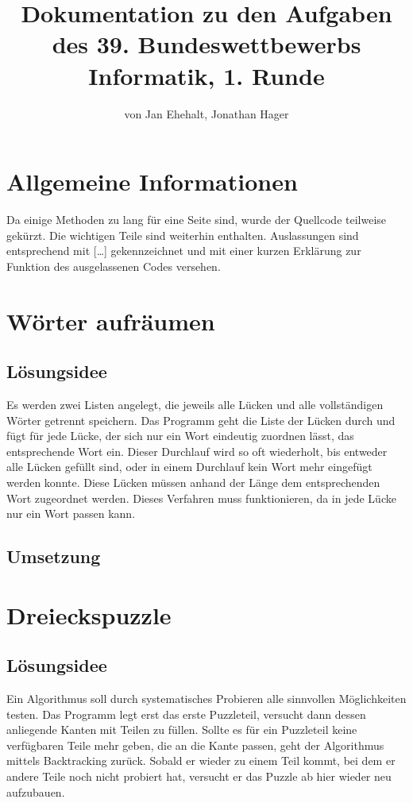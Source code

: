 \documentclass[a4paper, 12pt]{scrartcl}
\title{Dokumentation zu den Aufgaben des 39. Bundeswettbewerbs Informatik, 1. Runde}
\author{von Jan Ehehalt, Jonathan Hager}
\date{}
\begin{document}
\maketitle
\thispagestyle{empty}
\newpage
\tableofcontents
\thispagestyle{empty}
\newpage

\section{Allgemeine Informationen}

Da einige Methoden zu lang für eine Seite sind, wurde der Quellcode teilweise gekürzt. Die wichtigen Teile sind weiterhin enthalten. Auslassungen sind entsprechend mit {\glqq}[\dots]{\grqq} gekennzeichnet und mit einer kurzen Erklärung zur Funktion des ausgelassenen Codes versehen.

\section{Wörter aufräumen}
\subsection{Lösungsidee}

Es werden zwei Listen angelegt, die jeweils alle Lücken und alle vollständigen Wörter getrennt speichern. Das Programm geht die Liste der Lücken durch und fügt für jede Lücke, der sich nur ein Wort eindeutig zuordnen lässt, das entsprechende Wort ein. Dieser Durchlauf wird so oft wiederholt, bis entweder alle Lücken gefüllt sind, oder in einem Durchlauf kein Wort mehr eingefügt werden konnte. Diese Lücken müssen anhand der Länge dem entsprechenden Wort zugeordnet werden. Dieses Verfahren muss funktionieren, da in jede Lücke nur ein Wort passen kann.  

\subsection{Umsetzung}

\section{Dreieckspuzzle}
\subsection{Lösungsidee}

Ein Algorithmus soll durch systematisches Probieren alle sinnvollen Möglichkeiten testen. Das Programm legt erst das erste Puzzleteil, versucht dann dessen anliegende Kanten mit Teilen zu füllen. Sollte es für ein Puzzleteil keine verfügbaren Teile mehr geben, die an die Kante passen, geht der Algorithmus mittels Backtracking zurück. Sobald er wieder zu einem Teil kommt, bei dem er andere Teile noch nicht probiert hat, versucht er das Puzzle ab hier wieder neu aufzubauen.
\end{document}
